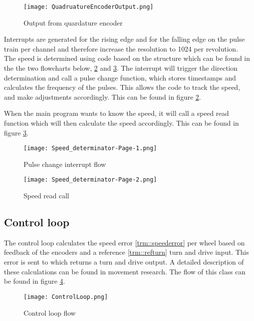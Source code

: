 \begin{figure}[H]
\centering
\texttt{[image: QuadruatureEncoderOutput.png]}
\caption{Output from quardature encoder}
\label{fig::QuadEnc}
\end{figure}


Interrupts are generated for the rising edge and for the falling edge on the pulse train per channel and therefore increase the resolution to 1024 per revolution. 
The speed is determined using code based on the structure which can be found in the the two flowcharts below, \ref{fig::PCF} and \ref{fig::SRC}. 
The interrupt will trigger the direction determination and call a pulse change function, which stores timestamps and calculates the frequency of the pulses.
This allows the code to track the speed, and make adjustments accordingly.
This can be found in figure \ref{fig::PCF}.

When the main program wants to know the speed, it will call a speed read function which will then calculate the speed accordingly. 
This can be found in figure \ref{fig::SRC}.

\begin{figure}[H]
\centering
\texttt{[image: Speed\_determinator-Page-1.png]}
\caption{Pulse change interrupt flow}
\label{fig::PCF}
\end{figure}


\begin{figure}[H]
\centering
\texttt{[image: Speed\_determinator-Page-2.png]}
\caption{Speed read call}
\label{fig::SRC}
\end{figure}

\subsection{Control loop}
The control loop calculates the speed error \ref{trm::speederror} per wheel based on feedback of the encoders and a reference \ref{trm::refturn} turn and drive input. 
This error is sent to  which returns a turn and drive output. 
A detailed description of these calculations can be found in movement research. 
The flow of this class can be found in figure \ref{fig::CLF}.

\begin{figure}[H]
\centering
\texttt{[image: ControlLoop.png]}
\caption{Control loop flow}
\label{fig::CLF}
\end{figure}

